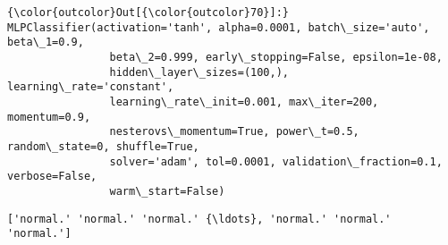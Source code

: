 \documentclass[11pt]{article}
\begin{document}
\begin{Verbatim}[commandchars=\\\{\}]
{\color{outcolor}Out[{\color{outcolor}70}]:} MLPClassifier(activation='tanh', alpha=0.0001, batch\_size='auto', beta\_1=0.9,
                beta\_2=0.999, early\_stopping=False, epsilon=1e-08,
                hidden\_layer\_sizes=(100,), learning\_rate='constant',
                learning\_rate\_init=0.001, max\_iter=200, momentum=0.9,
                nesterovs\_momentum=True, power\_t=0.5, random\_state=0, shuffle=True,
                solver='adam', tol=0.0001, validation\_fraction=0.1, verbose=False,
                warm\_start=False)
\end{Verbatim}
            
    \begin{Verbatim}[commandchars=\\\{\}]
['normal.' 'normal.' 'normal.' {\ldots}, 'normal.' 'normal.' 'normal.']

    \end{Verbatim}
\end{document}
